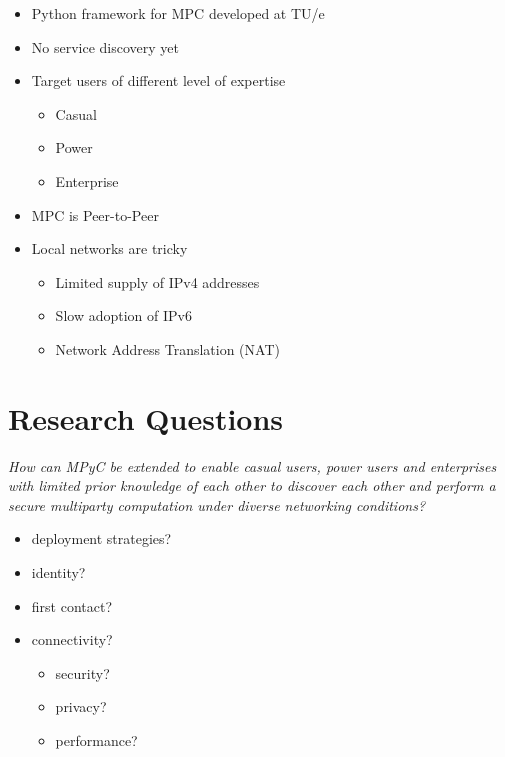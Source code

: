 \begin{itemize}
\tightlist
\item
  Python framework for MPC developed at TU/e
\item
  No service discovery yet
\item
  Target users of different level of expertise

  \begin{itemize}
  \tightlist
  \item
    Casual
  \item
    Power
  \item
    Enterprise
  \end{itemize}
\item
  MPC is Peer-to-Peer
\item
  Local networks are tricky

  \begin{itemize}
  \tightlist
  \item
    Limited supply of IPv4 addresses
  \item
    Slow adoption of IPv6
  \item
    Network Address Translation (NAT)
  \end{itemize}
\end{itemize}

\hypertarget{research-questions}{%
\part{Research Questions}\label{research-questions}}

\emph{How can MPyC be extended to enable casual users, power users and
enterprises with limited prior knowledge of each other to discover each
other and perform a secure multiparty computation under diverse
networking conditions?}

\begin{itemize}
\tightlist
\item
  deployment strategies?
\item
  identity?
\item
  first contact?
\item
  connectivity?

  \begin{itemize}
  \tightlist
  \item
    security?
  \item
    privacy?
  \item
    performance?
  \end{itemize}
\end{itemize}

